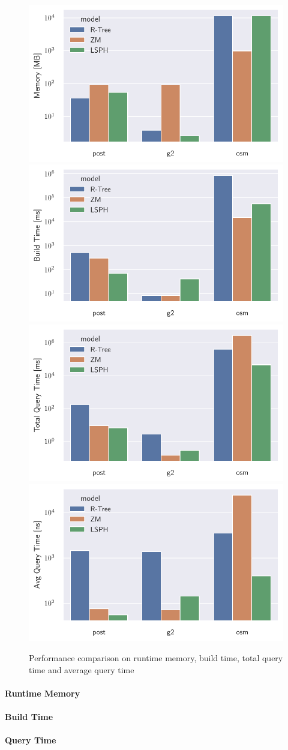 \begin{figure}
    \includegraphics[width=.5\textwidth]{Figures/memory.pdf}\hfill
    \includegraphics[width=.5\textwidth]{Figures/build_time.pdf}
    \\[\smallskipamount]
    \includegraphics[width=.5\textwidth]{Figures/query_time.pdf}\hfill
    \includegraphics[width=.5\textwidth]{Figures/avg_query_time.pdf}
    \caption{Performance comparison on runtime memory, build time, total query time and average query time}\label{fig:performance}
\end{figure}

\paragraph{Runtime Memory}

\paragraph{Build Time}

\paragraph{Query Time}